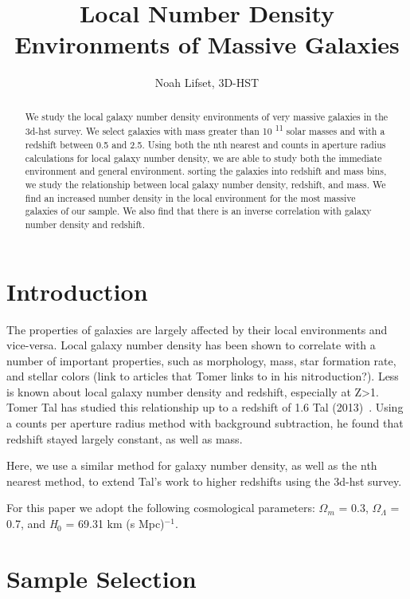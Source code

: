 \documentclass[apj]{emulateapj}
\begin{document}
 
\title{Local Number Density Environments of Massive Galaxies}

\author{Noah Lifset, 3D-HST}

\begin{abstract}

We study the local galaxy number density environments of very massive galaxies in the 3d-hst survey. We select galaxies with mass greater than 10 \textsuperscript{11} solar masses and with a redshift between 0.5 and 2.5. Using both the nth nearest and counts in aperture radius calculations for local galaxy number density, we are able to study both the immediate environment and general environment. sorting the galaxies into  redshift and mass bins, we study the relationship between local galaxy number density, redshift, and mass. We find an increased number density in the local environment for the most massive galaxies of our sample. We also find that there is an inverse correlation with galaxy number density and redshift. 

\end{abstract}
\keywords{}

\section{Introduction}

The properties of galaxies are largely affected by their local environments and vice-versa. Local galaxy number density has been shown to correlate with a number of important properties, such as morphology, mass, star formation rate, and stellar colors (link to articles that Tomer links to in his nitroduction?). Less is known about local galaxy number density and redshift, especially at Z\textgreater1. Tomer Tal has studied this relationship up to a redshift of 1.6 Tal (2013)~\cite{2013ApJ...769...31T}. Using a counts per aperture radius method with background subtraction, he found that redshift stayed largely constant, as well as mass.

Here, we use a similar method for galaxy number density, as well as the nth nearest method, to extend Tal's work to higher redshifts using the 3d-hst survey.

For this paper we adopt the following cosmological parameters: $\Omega_{m}$ = 0.3, $\Omega_{\Lambda}$ = 0.7, and \textit{H}$_{0}$ = 69.31 km (s Mpc)$^{-1}$.

\section{Sample Selection}
\end{document}
